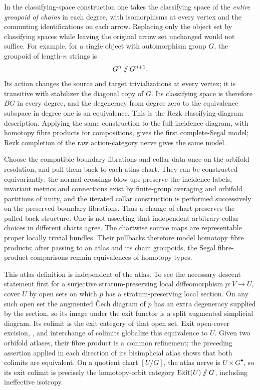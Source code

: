 
In the classifying-space construction one takes the classifying space of the \emph{entire groupoid of chains} in each degree, with isomorphisms at every vertex and the commuting identifications on each arrow. Replacing only the object set by classifying spaces while leaving the original arrow set unchanged would not suffice. For example, for a single object with automorphism group \(G\), the groupoid of length-\(n\) strings is
\[
 G^n\mathbin{/\mkern-6mu/}G^{n+1}.
\]
Its action changes the source and target trivializations at every vertex; it is transitive with stabilizer the diagonal copy of \(G\). Its classifying space is therefore \(BG\) in every degree, and the degeneracy from degree zero to the equivalence subspace in degree one is an equivalence. This is the Rezk classifying-diagram description. Applying the same construction to the full incidence diagram, with homotopy fibre products for compositions, gives the first complete-Segal model; Rezk completion of the raw action-category nerve gives the same model.

Choose the compatible boundary fibrations and collar data once on the orbifold resolution, and pull them back to each atlas chart. They can be constructed equivariantly: the normal-crossings blow-ups preserve the incidence labels, invariant metrics and connections exist by finite-group averaging and orbifold partitions of unity, and the iterated collar construction is performed successively on the preserved boundary fibrations. Thus a change of chart preserves the pulled-back structure. One is not asserting that independent arbitrary collar choices in different charts agree. The chartwise source maps are representable proper locally trivial bundles. Their pullbacks therefore model homotopy fibre products; after passing to an atlas and its chain groupoids, the Segal fibre-product comparisons remain equivalences of homotopy types.

This atlas definition is independent of the atlas. To see the necessary descent statement first for a surjective stratum-preserving local diffeomorphism \(p:V\to U\), cover \(U\) by open sets on which \(p\) has a stratum-preserving local section. On any such open set the augmented \v Cech diagram of \(p\) has an extra degeneracy supplied by the section, so its image under the exit functor is a split augmented simplicial diagram. Its colimit is the exit category of that open set. Exit open-cover excision, \cite[Theorem A.7.1]{LurieHA}, and interchange of colimits globalize this equivalence to \(U\). Given two orbifold atlases, their fibre product is a common refinement; the preceding assertion applied in each direction of its bisimplicial atlas shows that both colimits are equivalent. On a quotient chart \([U/G]\), the atlas nerve is \(U\times G^\bullet\), so its exit colimit is precisely the homotopy-orbit category \(\operatorname{Exit}(U)\mathbin{/\mkern-6mu/}G\), including ineffective isotropy.
